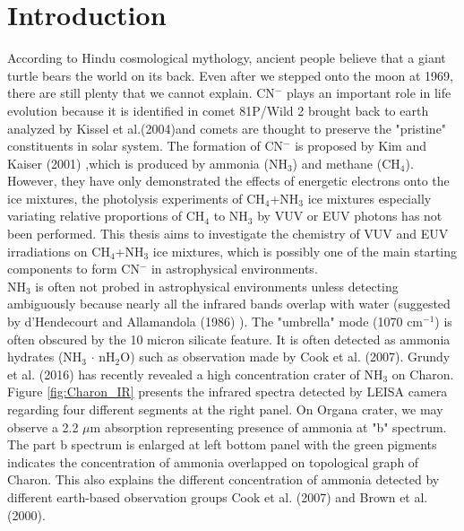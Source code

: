 \chapter{\protect Introduction}
\label{introduction}

According to Hindu cosmological mythology, ancient people believe that a giant turtle bears the world on its back. Even after we stepped onto the moon at 1969, there are still plenty that we cannot explain. CN$^-$ plays an important role in life evolution because it is identified in comet 81P/Wild 2 brought back to earth analyzed by Kissel et al.(2004)\cite{kissel2004cometary}and comets are thought to preserve the "pristine" constituents in solar system. The formation of CN$^-$ is proposed by Kim and Kaiser (2001) \cite{kim},which is produced by ammonia (NH$_3$) and methane (CH$_4$). However, they have only demonstrated the effects of energetic electrons onto the ice mixtures, the photolysis experiments of CH$_4$+NH$_3$ ice mixtures especially variating relative proportions of CH$_4$ to NH$_3$ by VUV or EUV photons has not been performed. This thesis aims to investigate the chemistry of VUV and EUV irradiations on CH$_4$+NH$_3$ ice mixtures, which is possibly one of the main starting components to form CN$^-$ in astrophysical environments.\\

NH$_3$ is often not probed in astrophysical environments unless detecting ambiguously because nearly all the infrared bands overlap with water (suggested by d'Hendecourt and Allamandola (1986) \cite{d1986time}). The "umbrella" mode (1070 cm$^{-1}$) is often obscured by the 10 micron silicate feature. It is often detected as ammonia hydrates (NH$_3$ $\cdot$ nH$_2$O) such as observation made by Cook et al. (2007)\cite{cook2007near}. Grundy et al. (2016)\cite{grundy2016surface} has recently revealed a high concentration crater of NH$_3$ on Charon. Figure \ref{fig:Charon_IR} presents the infrared spectra detected by LEISA camera regarding four different segments at the right panel. On Organa crater, we may observe a 2.2 $\mu$m absorption representing presence of ammonia at "b" spectrum. The part b spectrum is enlarged at left bottom panel with the green pigments indicates the concentration of ammonia overlapped on topological graph of Charon. This also explains the different concentration of ammonia detected by different earth-based observation groups Cook et al. (2007)\cite{cook2007near} and Brown et al. (2000)\cite{brown2000evidence}.\\

